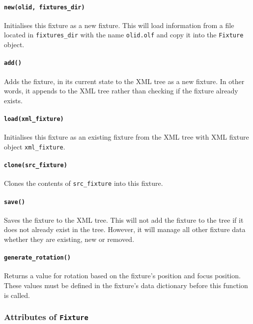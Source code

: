 \documentclass[a4paper]{article}
\begin{document}
\paragraph{\texttt{new(olid, fixtures\_dir)}}
Initialises this fixture as a new fixture. This will load information from a 
file located in \texttt{fixtures\_dir} with the name \texttt{olid.olf} and 
copy it into the \texttt{Fixture} object.

\paragraph{\texttt{add()}}
Adds the fixture, in its current state to the XML tree as a new fixture. In 
other words, it appends to the XML tree rather than checking if the fixture 
already exists.

\paragraph{\texttt{load(xml\_fixture)}}
Initialises this fixture as an existing fixture from the XML tree with 
XML fixture object \texttt{xml\_fixture}.

\paragraph{\texttt{clone(src\_fixture)}}
Clones the contents of \texttt{src\_fixture} into this fixture.

\paragraph{\texttt{save()}}
Saves the fixture to the XML tree. This will not add the fixture to the tree 
if it does not already exist in the tree. However, it will manage all other 
fixture data whether they are existing, new or removed.

\paragraph{\texttt{generate\_rotation()}}
Returns a value for rotation based on the fixture's position and focus 
position. These values must be defined in the fixture's data dictionary 
before this function is called.

\subsubsection{Attributes of \texttt{Fixture}}
\end{document}
